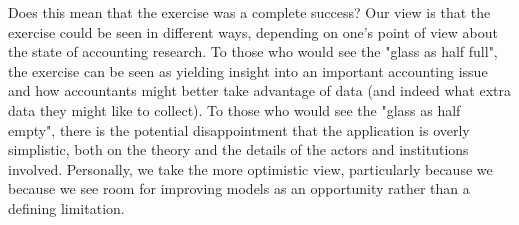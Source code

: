 Does this mean that the exercise was a complete success? Our view is that the exercise could be seen
in different ways, depending on one's point of view about the state of accounting research. To those
who would see the  "glass as half full", the exercise can be seen as yielding insight into an important
accounting issue and how accountants might better take advantage of data (and indeed what extra
data they might like to collect). To those who would see the  "glass as half empty", there is the potential
disappointment that the application is overly simplistic, both on the theory and the details of the
actors and institutions involved. Personally, we take the more optimistic view, particularly because we
because we see room for improving models as an opportunity rather than a defining limitation.